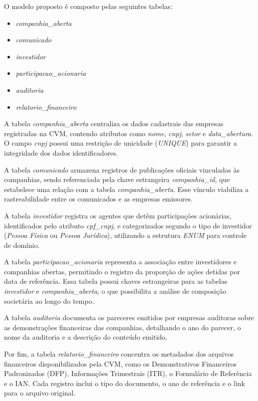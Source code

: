 \documentclass[recuosum=1.5cm]{iftex2024}
\begin{document}
O modelo proposto é composto pelas seguintes tabelas:

\begin{itemize}
	\item \textit{companhia\_aberta}
	\item \textit{comunicado}
	\item \textit{investidor}
	\item \textit{participacao\_acionaria}
	\item \textit{auditoria}
	\item \textit{relatorio\_financeiro}
\end{itemize}

A tabela \textit{companhia\_aberta} centraliza os dados cadastrais das empresas registradas na CVM, contendo atributos como \textit{nome}, \textit{cnpj}, \textit{setor} e \textit{data\_abertura}. O campo \textit{cnpj} possui uma restrição de unicidade (\textit{UNIQUE}) para garantir a integridade dos dados identificadores.

A tabela \textit{comunicado} armazena registros de publicações oficiais vinculadas às companhias, sendo referenciada pela chave estrangeira \textit{companhia\_id}, que estabelece uma relação com a tabela \textit{companhia\_aberta}. Esse vínculo viabiliza a rastreabilidade entre os comunicados e as empresas emissores.

A tabela \textit{investidor} registra os agentes que detêm participações acionárias, identificados pelo atributo \textit{cpf\_cnpj}, e categorizados segundo o tipo de investidor (\textit{Pessoa Física} ou \textit{Pessoa Jurídica}), utilizando a estrutura \textit{ENUM} para controle de domínio.

A tabela \textit{participacao\_acionaria} representa a associação entre investidores e companhias abertas, permitindo o registro da proporção de ações detidas por data de referência. Essa tabela possui chaves estrangeiras para as tabelas \textit{investidor} e \textit{companhia\_aberta}, o que possibilita a análise de composição societária ao longo do tempo.

A tabela \textit{auditoria} documenta os pareceres emitidos por empresas auditoras sobre as demonstrações financeiras das companhias, detalhando o ano do parecer, o nome da auditoria e a descrição do conteúdo emitido.

Por fim, a tabela \textit{relatorio\_financeiro} concentra os metadados dos arquivos financeiros disponibilizados pela CVM, como os Demonstrativos Financeiros Padronizados (DFP), Informações Trimestrais (ITR), o Formulário de Referência e o IAN. Cada registro inclui o tipo do documento, o ano de referência e o link para o arquivo original.
\end{document}
